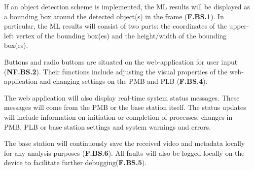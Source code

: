 If an object detection scheme is implemented, the ML results will be displayed as a bounding box around the detected object(s) in the frame (\textbf{F.BS.1}). In particular, the ML results will consist of two parts: the coordinates of the upper-left vertex of the bounding box(es) and the height/width of the bounding box(es).

Buttons and radio buttons are situated on the web-application for user input (\textbf{NF.BS.2}). Their functions include adjusting the visual properties of the web-application and changing settings on the PMB and PLB (\textbf{F.BS.4}). 

The web application will also display real-time system status messages. These messages will come from the PMB or the base station itself. The status updates will include information on initiation or completion of processes, changes in PMB, PLB or base station settings and system warnings and errors.

The base station will continuously save the received video and metadata locally for any analysis purposes (\textbf{F.BS.6}). All faults will also be logged locally on the device to facilitate further debugging(\textbf{F.BS.5}).


